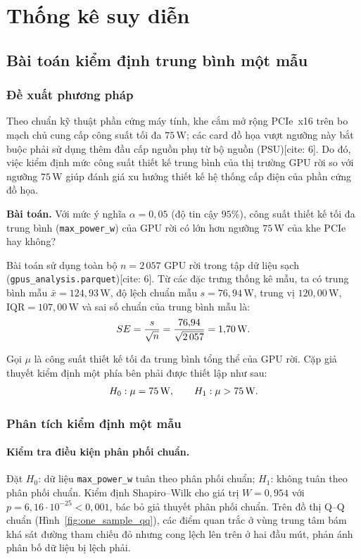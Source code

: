 \documentclass[12pt,a4paper]{article}
\begin{document}
\section{Thống kê suy diễn}

\subsection{Bài toán kiểm định trung bình một mẫu}

\subsubsection{Đề xuất phương pháp}

Theo chuẩn kỹ thuật phần cứng máy tính, khe cắm mở rộng PCIe~x16 trên bo mạch chủ cung cấp công suất tối đa $75$\,W; các card đồ họa vượt ngưỡng này bắt buộc phải sử dụng thêm đầu cấp nguồn phụ từ bộ nguồn (PSU)[cite: 6]. Do đó, việc kiểm định mức công suất thiết kế trung bình của thị trường GPU rời so với ngưỡng $75$\,W giúp đánh giá xu hướng thiết kế hệ thống cấp điện của phần cứng đồ họa.

\textbf{Bài toán.} Với mức ý nghĩa $\alpha = 0{,}05$ (độ tin cậy $95\%$), công suất thiết kế tối đa trung bình (\texttt{max\_power\_w}) của GPU rời có lớn hơn ngưỡng $75$\,W của khe PCIe hay không?

Bài toán sử dụng toàn bộ $n = 2\,057$ GPU rời trong tập dữ liệu sạch (\texttt{gpus\_analysis.parquet})[cite: 6]. Từ các đặc trưng thống kê mẫu, ta có trung bình mẫu $\bar{x} = 124{,}93$\,W, độ lệch chuẩn mẫu $s = 76{,}94$\,W, trung vị $120{,}00$\,W, $\text{IQR} = 107{,}00$\,W và sai số chuẩn của trung bình mẫu là:
\[
  SE = \frac{s}{\sqrt{n}} = \frac{76{,}94}{\sqrt{2\,057}} = 1{,}70\text{\,W}.
\]

Gọi $\mu$ là công suất thiết kế tối đa trung bình tổng thể của GPU rời. Cặp giả thuyết kiểm định một phía bên phải được thiết lập như sau:
\[
  H_0: \mu = 75\text{\,W}, \qquad H_1: \mu > 75\text{\,W}.
\]

\subsubsection{Phân tích kiểm định một mẫu}

\paragraph{Kiểm tra điều kiện phân phối chuẩn.}
Đặt $H_0$: dữ liệu \texttt{max\_power\_w} tuân theo phân phối chuẩn; $H_1$: không tuân theo phân phối chuẩn. Kiểm định Shapiro--Wilk cho giá trị $W = 0{,}954$ với $p = 6{,}16 \cdot 10^{-25} < 0{,}001$, bác bỏ giả thuyết phân phối chuẩn. Trên đồ thị Q--Q chuẩn (Hình~\ref{fig:one_sample_qq}), các điểm quan trắc ở vùng trung tâm bám khá sát đường tham chiếu đỏ nhưng cong lệch lên trên ở hai đầu mút, phản ánh phân bố dữ liệu bị lệch phải.
\end{document}
